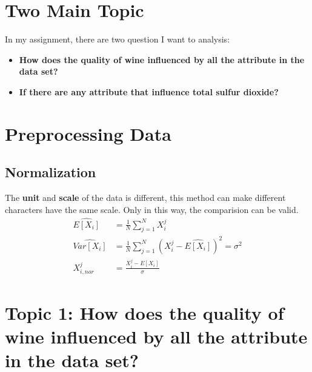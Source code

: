 \documentclass[titlepage,a4paper,12pt,thmsb]{report}
\begin{document}



\chapter*{Two Main Topic}

In my assignment, there are two question I want to analysis:
\newline{}
\begin{itemize}
\item{\bf How does the quality of wine influenced by all the attribute in the data set?}
\item{\bf If there are any attribute that influence total sulfur dioxide?}
\end{itemize}


\chapter*{Preprocessing Data}


\section*{Normalization}
The {\bf unit} and {\bf scale} of the data is different, this method can make different characters have the same scale.  Only in this way, the comparision can be valid.
$$
\begin{align}
  \widehat{E[X_i]} &= \frac{1}{N} \sum_{j=1}^{N} X_i^j \\
  \widehat{Var[X_i]}  &= \frac{1}{N} \sum_{j=1}^N (X_i^j - \widehat{E[X_i]})^2 = \sigma^2 \\
  \widehat{X_{i,nor}^j} &= \frac{X_i^j - E[X_i]}{\sigma}
\end{align}
$$



\chapter{Topic 1: How does the quality of wine influenced by all the attribute in the data set? }
\end{document}
